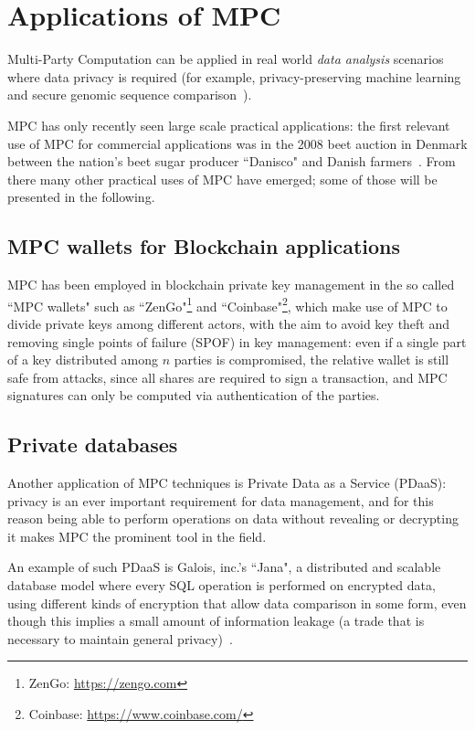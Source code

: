\section{Applications of MPC}\label{sec:rl}

Multi-Party Computation can be applied in real world \textit{data analysis} scenarios where data privacy is required (for example, privacy-preserving machine learning and secure genomic sequence comparison~\cite{applications}).

MPC has only recently seen large scale practical applications: the first relevant use of MPC for commercial applications was in the 2008 beet auction in Denmark between the nation's beet sugar producer ``Danisco" and Danish farmers~\cite{beet}. From there many other practical uses of MPC have emerged; some of those will be presented in the following.

\subsection{MPC wallets for Blockchain applications}

MPC has been employed in blockchain private key management in the so called ``MPC wallets" such as ``ZenGo"\footnote{ZenGo: \href{https://zengo.com}{https://zengo.com}} and ``Coinbase"\footnote{Coinbase: \href{https://www.coinbase.com/}{https://www.coinbase.com/}}, which make use of MPC to divide private keys among different actors, with the aim to avoid key theft and removing single points of failure (SPOF) in key management: even if a single part of a key distributed among $n$ parties is compromised, the relative wallet is still safe from attacks, since all shares are required to sign a transaction, and MPC signatures can only be computed via authentication of the parties.

\subsection{Private databases}

Another application of MPC techniques is Private Data as a Service (PDaaS): privacy is an ever important requirement for data management, and for this reason being able to perform operations on data without revealing or decrypting it makes MPC the prominent tool in the field.

An example of such PDaaS is Galois, inc.'s ``Jana", a distributed and scalable database model where every SQL operation is performed on encrypted data, using different kinds of encryption that allow data comparison in some form, even though this implies a small amount of information leakage (a trade that is necessary to maintain general privacy)~\cite{jana}.